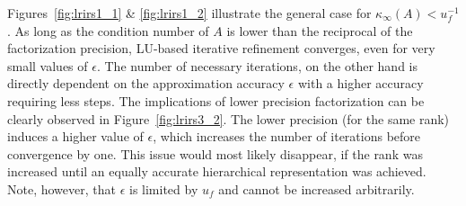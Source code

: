Figures~\hyperref[fig:lrirs1_1]{\ref{fig:lrirs1_1}} \& \hyperref[fig:lrirs1_2]{\ref{fig:lrirs1_2}} illustrate the general case for $\kappa_\infty(A)<u_f^{-1}$. As long as the condition number of $A$ is lower than the reciprocal of the factorization precision, LU-based iterative refinement converges, even for very small values of $\epsilon$. The number of necessary iterations, on the other hand is directly dependent on the approximation accuracy $\epsilon$ with a higher accuracy requiring less steps. The implications of lower precision factorization can be clearly observed in Figure~\hyperref[fig:lrirs3_2]{\ref{fig:lrirs3_2}}. The lower precision (for the same rank) induces a higher value of $\epsilon$, which increases the number of iterations before convergence by one. This issue would most likely disappear, if the rank was increased until an equally accurate hierarchical representation was achieved. Note, however, that $\epsilon$ is limited by $u_f$ and cannot be increased arbitrarily.

